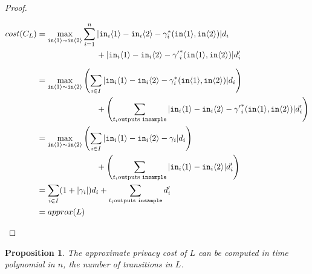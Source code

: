 \documentclass[12pt]{article}
\newcommand{\brangle}[1]{\langle#1 \rangle}
\newtheorem{prop}[thm]{Proposition}
\theoremstyle{definition}
\begin{document}
\begin{proof}
\begin{itemize}
        \begin{align*}
            cost(C_L) &= \max_{\texttt{in}\brangle{1}\sim \texttt{in}\brangle{2}} \sum_{i = 1}^n  |\texttt{in}_i\brangle{1} - \texttt{in}_i\brangle{2} - \gamma_i^*(\texttt{in}\brangle{1}, \texttt{in}\brangle{2})| d_i \\ 
            \phantom{cost(C_L)} &\phantom{=\max_{\texttt{in}\brangle{1}\sim \texttt{in}\brangle{2}}\qquad } + |\texttt{in}_i\brangle{1} - \texttt{in}_i\brangle{2} - {\gamma'}_i^*(\texttt{in}\brangle{1}, \texttt{in}\brangle{2})|d_i' \\
            &= \max_{\texttt{in}\brangle{1}\sim \texttt{in}\brangle{2}} \left(\sum_{i \in I} |\texttt{in}_i\brangle{1} - \texttt{in}_i\brangle{2} - \gamma_i^*(\texttt{in}\brangle{1}, \texttt{in}\brangle{2})| d_i\right) \\
            \phantom{cost(C_L)} &\phantom{=\max_{\texttt{in}\brangle{1}\sim \texttt{in}\brangle{2}}\qquad } + \left(\sum_{t_i \text{outputs \texttt{insample}}}|\texttt{in}_i\brangle{1} - \texttt{in}_i\brangle{2} - {\gamma'}_i^*(\texttt{in}\brangle{1}, \texttt{in}\brangle{2})|d_i'\right)\\
            &= \max_{\texttt{in}\brangle{1}\sim \texttt{in}\brangle{2}} \left(\sum_{i \in I} |\texttt{in}_i\brangle{1} - \texttt{in}_i\brangle{2} - \gamma_i| d_i\right) \\
            \phantom{cost(C_L)} &\phantom{=\max_{\texttt{in}\brangle{1}\sim \texttt{in}\brangle{2}}\qquad } + \left(\sum_{t_i \text{outputs \texttt{insample}}}|\texttt{in}_i\brangle{1} - \texttt{in}_i\brangle{2}|d_i'\right)\\
            &= \sum_{i \in I} (1 + |\gamma_i|) d_i + \sum_{t_i \text{outputs \texttt{insample}}} d_i' \\
            &= approx(L)
        \end{align*}
    \end{itemize}
\end{proof}

\begin{prop}
    The approximate privacy cost of $L$ can be computed in time polynomial in $n$, the number of transitions in $L$.
\end{prop}
\end{document}
